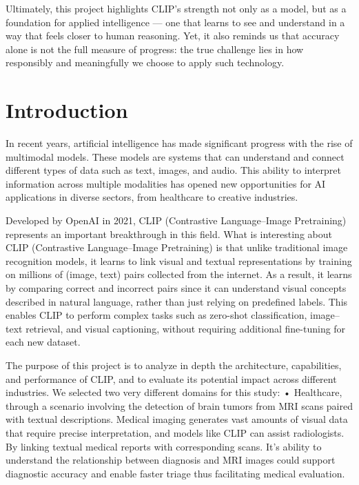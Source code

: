 \documentclass[12pt]{article}
\begin{document}
Ultimately, this project highlights CLIP’s strength not only as a model, but as a foundation for applied intelligence — one that learns to see and understand in a way that feels closer to human reasoning. Yet, it also reminds us that accuracy alone is not the full measure of progress: the true challenge lies in how responsibly and meaningfully we choose to apply such technology.
\newpage

\section{Introduction}
In recent years, artificial intelligence has made significant progress with the rise of multimodal models. These models are systems that can understand and connect different types of data such as text, images, and audio. This ability to interpret information across multiple modalities has opened new opportunities for AI applications in diverse sectors, from healthcare to creative industries.

Developed by OpenAI in 2021, CLIP (Contrastive Language–Image Pretraining) represents an important breakthrough in this field. What is interesting about CLIP (Contrastive Language–Image Pretraining) is that unlike traditional image recognition models, it learns to link visual and textual representations by training on millions of (image, text) pairs collected from the internet. As a result, it learns by comparing correct and incorrect pairs since it can understand visual concepts described in natural language, rather than just relying on predefined labels. This enables CLIP to perform complex tasks such as zero-shot classification, image–text retrieval, and visual captioning, without requiring additional fine-tuning for each new dataset.

The purpose of this project is to analyze in depth the architecture, capabilities, and performance of CLIP, and to evaluate its potential impact across different industries. We selected two very different domains for this study:
•	Healthcare, through a scenario involving the detection of brain tumors from MRI scans paired with textual descriptions. Medical imaging generates vast amounts of visual data that require precise interpretation, and models like CLIP can assist radiologists. By linking textual medical reports with corresponding scans. It’s ability to understand the relationship between diagnosis and MRI images could support diagnostic accuracy and enable faster triage thus facilitating medical evaluation.
\end{document}
